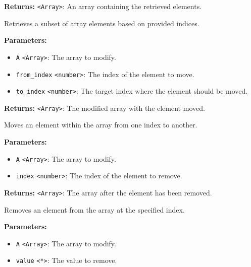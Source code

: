 \documentclass[12pt,a4paper]{article}
\begin{document}
\noindent \textbf{Returns:} \texttt{<Array>}: An array containing the retrieved elements.

\noindent Retrieves a subset of array elements based on provided indices.

\vspace{5mm}
\noindent {}


\noindent \textbf{Parameters:}
\begin{itemize}
  \item \texttt{A} \texttt{<Array>}: The array to modify.
  \item \texttt{from\_index} \texttt{<number>}: The index of the element to move.
  \item \texttt{to\_index} \texttt{<number>}: The target index where the element should be moved.
\end{itemize}

\noindent \textbf{Returns:} \texttt{<Array>}: The modified array with the element moved.

\noindent Moves an element within the array from one index to another.

\vspace{5mm}
\noindent {}


\noindent \textbf{Parameters:}
\begin{itemize}
  \item \texttt{A} \texttt{<Array>}: The array to modify.
  \item \texttt{index} \texttt{<number>}: The index of the element to remove.
\end{itemize}

\noindent \textbf{Returns:} \texttt{<Array>}: The array after the element has been removed.

\noindent Removes an element from the array at the specified index.

\vspace{5mm}
\noindent {}


\noindent \textbf{Parameters:}
\begin{itemize}
  \item \texttt{A} \texttt{<Array>}: The array to modify.
  \item \texttt{value} \texttt{<*>}: The value to remove.
\end{itemize}
\end{document}
